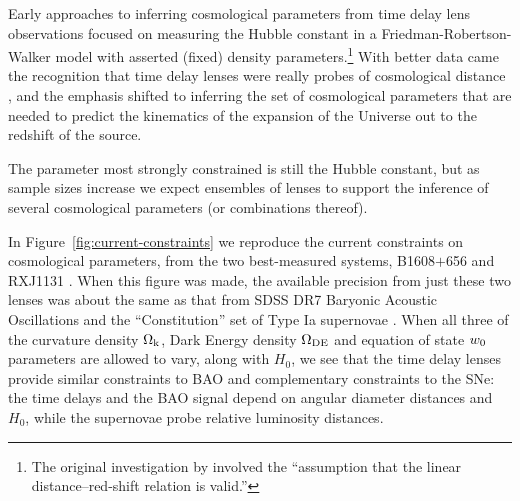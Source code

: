 


Early approaches to inferring cosmological parameters from time delay
lens observations focused on measuring the Hubble constant in a
Friedman-Robertson-Walker model with asserted (fixed) density
parameters.\footnote{The original investigation by \citet{Ref64}
involved the ``assumption that the linear distance--red-shift relation
is valid.''} With better data came the recognition that time delay
lenses were really probes of cosmological distance
\citep{Koo++03,Suy++10}, and the emphasis shifted to
inferring the set of cosmological parameters that are needed  to predict
the kinematics of the expansion of the Universe out to the redshift of
the source.

The parameter most strongly constrained is still the Hubble constant,
but as sample sizes increase we expect ensembles of lenses to support
the inference of several cosmological parameters (or combinations
thereof).

In Figure~\ref{fig:current-constraints} we reproduce the current
constraints on cosmological parameters, from the two best-measured
systems, B1608$+$656 and RXJ1131 \citep{Suy++14}. When this figure was
made, the available precision from just these two lenses was about the
same as that from SDSS DR7 Baryonic Acoustic Oscillations
\citep{PercivalEtal2010} and the ``Constitution'' set of Type Ia
supernovae \citep{HickenEtal2009}.  When all three of the curvature
density $\Omega_{\rm k}$, Dark Energy density $\Omega_{\rm DE}$ and equation of state $w_0$
parameters are allowed to vary, along with $H_0$, we see that the time
delay lenses provide similar constraints to BAO and complementary
constraints to the SNe: the time delays and the BAO signal depend on
angular diameter distances and $H_0$, while the supernovae probe
relative luminosity distances.

